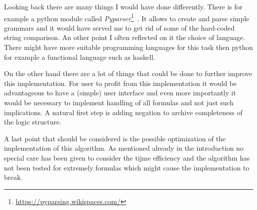 Looking back there are many things I would have done differently. There is for example a python module called \emph{Pyparser}\footnote{\href{https://pyparsing.wikispaces.com/}{https://pyparsing.wikispaces.com/}}~. It allows to create and parse simple grammars and it would have served me to get rid of some of the hard-coded string comparison. An other point I often reflected on it the choice of language. There might have more suitable programming languages for this task then python for example a functional language such as haskell. 

On the other hand there are a lot of things that could be done to further improve this implementation. For user to profit from this implementation it would be advantageous to have a (simple) user interface and even more importantly it would be necessary to implement handling of all formulas and not just such implications. A natural first step is adding negation to archive completeness of the logic structure.

A last point that should be considered is the possible optimization of the implementation of this algorithm. As mentioned already in the introduction no special care has been given to consider the tijme efficiency and the algorithm has not been tested for extremely formulas which might cause the implementation to break. 